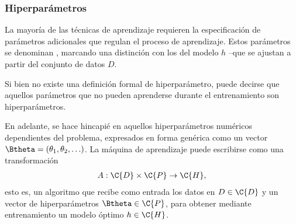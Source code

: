 %
\subsubsection{Hiperparámetros}
%
La mayoría de las técnicas de aprendizaje
requieren la especificación de parámetros adicionales que regulan el
proceso de aprendizaje. Estos parámetros se denominan
, marcando una distinción con los 
del modelo $h$ --que se ajustan a partir del conjunto de datos
$D$.

Si bien no existe una definición formal de hiperparámetro, 
puede decirse que aquellos parámetros que no pueden aprenderse durante el entrenamiento son hiperparámetros.


En adelante, se hace hincapié en aquellos
hiperparámetros numéricos dependientes del problema, expresados en
forma genérica como un vector
$\Btheta=(\theta_1,\theta_2,\ldots)$. La máquina de
aprendizaje puede escribirse como una transformación
%
\begin{align}
  A:\C{D}\times\C{P}\rightarrow\C{H},
\end{align}
%
esto es, un algoritmo que recibe como entrada los datos en $D\in\C{D}$
y un vector de hiperparámetros $\Btheta\in\C{P}$, para obtener
mediante entrenamiento un modelo óptimo $h\in\C{H}$.
